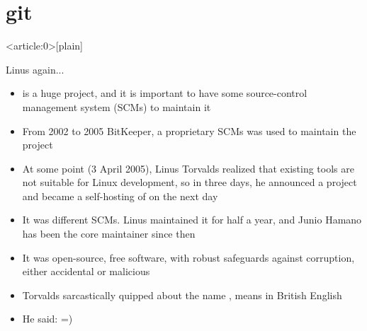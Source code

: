 \documentclass[usenames,dvipsnames,10pt,aspectratio=169]{beamer}
\begin{document}
\section{git}
{ %
    \begin{frame}<article:0>[plain]
     \end{frame}
}

\begin{frame}{Linus again...}
    \begin{itemize}
        \item {} is a huge project, and it is important to have some source-control management system (SCMs) to maintain it
        \item From 2002 to 2005 BitKeeper, a proprietary SCMs was used to maintain the project
        \item At some point (3 April 2005), Linus Torvalds realized that existing tools are not suitable for Linux development, so in three days, he announced a project and became a self-hosting of  on the next day
        \item It was different SCMs. Linus maintained it for half a year, and Junio Hamano has been the core maintainer since then
        \item It was open-source, free software, with robust safeguards against corruption, either accidental or malicious
        \item Torvalds sarcastically quipped about the name , means  in British English
        \item He said:  =)
    \end{itemize}
\end{frame}
\end{document}
